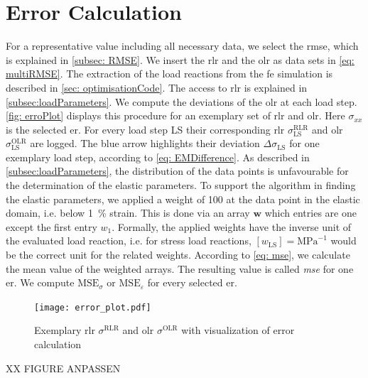 \section{Error Calculation}\label{sec: errorCalculation}
For a representative value including all necessary data, we select the \acrshort{rmse}, which is explained in \autoref{subsec: RMSE}.
We insert the \acrlong{rlr} and the \acrlong{olr} as data sets in \autoref{eq: multiRMSE}.
The extraction of the load reactions from the \acrshort{fe} simulation is described in \autoref{sec: optimisationCode}.
The access to \acrlong{rlr} is explained in \autoref{subsec:loadParameters}.
We compute the deviations of the \acrlong{olr} at each load step. \autoref{fig: erroPlot} displays this procedure for an exemplary set of \acrlong{rlr} and \acrlong{olr}. Here $\sigma_{xx}$ is the selected \acrlong{er}.
For every load step LS their corresponding \acrfull{rlr} $\sigma_{\scriptscriptstyle\text{LS}}^{\scriptscriptstyle\text{RLR}}$ and \acrfull{olr} $\sigma_{\scriptscriptstyle\text{LS}}^{\scriptscriptstyle\text{OLR}}$ are logged. The blue arrow highlights their deviation $\Delta\sigma_{\scriptscriptstyle\text{LS}}$ for one exemplary load step, according to \autoref{eq: EMDifference}. 
As described in \autoref{subsec:loadParameters}, the distribution of the data points is unfavourable for the determination of the elastic parameters. 
To support the algorithm in finding the elastic parameters, we applied a weight of 100 at the data point in the elastic domain, i.e. below 1 \% strain. This is done via an array $\boldsymbol{w}$ which entries are one except the first entry $w_{\scriptscriptstyle\text{1}}$. Formally, the applied weights have the inverse unit of the evaluated load reaction, i.e. for stress load reactions, $[w_{\text{LS}}] = \text{MPa}^{-1}$ would be the correct unit for the related weights.
According to \autoref{eq: mse}, we calculate the mean value of the weighted arrays.
The resulting value is called \emph{\acrfull{mse}} for one \acrlong{er}. We compute $\text{MSE}_{\sigma}$ or $\text{MSE}_{\varepsilon}$ for every selected \acrlong{er}. 

\begin{figure}[H]
    \centering
    \texttt{[image: error\_plot.pdf]}
    \caption{Exemplary \acrlong{rlr} $\sigma^{\scriptscriptstyle\text{RLR}}$ and \acrlong{olr} $\sigma^{\scriptscriptstyle\text{OLR}}$ with visualization of error calculation}
    \label{fig: erroPlot}
\end{figure}
XX FIGURE ANPASSEN

